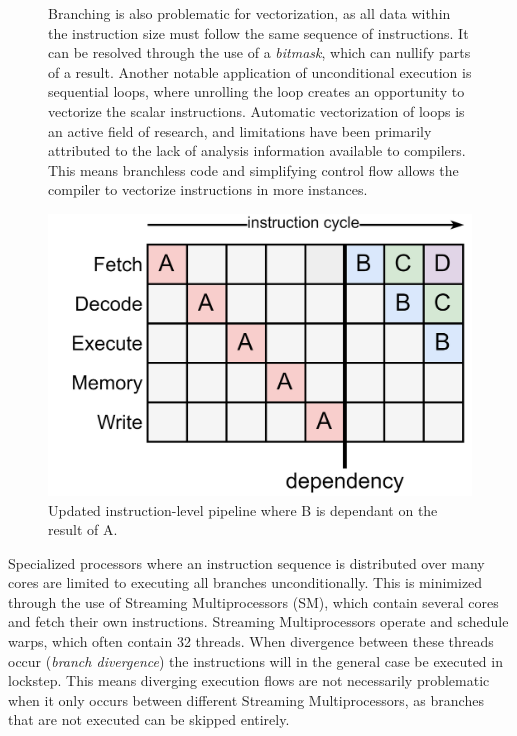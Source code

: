 \documentclass{article}
\begin{document}
\begin{figure}[ht]
    \begin{minipage}{.5\textwidth}
        Branching is also problematic for vectorization, as all data within the instruction size must follow the same sequence of instructions.
        It can be resolved through the use of a {\it bitmask}, which can nullify parts of a result\cite{assembly-optimizations}.  
        Another notable application of unconditional execution is sequential loops, where unrolling the loop creates an opportunity to vectorize the scalar instructions.
        Automatic vectorization of loops is an active field of research, and limitations have been primarily attributed to the lack of analysis information available to compilers\cite{automatic-vectorization}. 
        This means branchless code and simplifying control flow allows the compiler to vectorize instructions in more instances.   
    \end{minipage}%
    \begin{minipage}{.5\textwidth}
        \centering
        \includegraphics[scale=0.09]{Performance8.png}
        \captionsetup{margin=0.5cm}
        \captionsetup{format=plain}
        \caption
        { 
            Updated instruction-level pipeline where B is dependant on the result of A.
        }
    \end{minipage}
\end{figure}

\vspace{-0.5em}

Specialized processors where an instruction sequence is distributed over many cores are limited to executing all branches unconditionally.
This is minimized through the use of Streaming Multiprocessors (SM), which contain several cores and fetch their own instructions.
Streaming Multiprocessors operate and schedule warps, which often contain 32 threads.
When divergence between these threads occur ({\it branch divergence}) the instructions will in the general case be executed in lockstep\cite{threads-independent-scheduling}.
This means diverging execution flows are not necessarily problematic when it only occurs between different Streaming Multiprocessors, as branches that are not executed can be skipped entirely.
\end{document}
